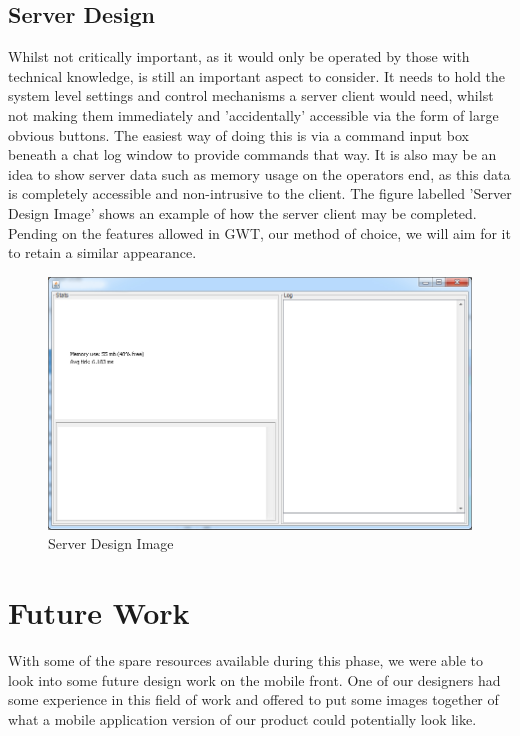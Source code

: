 \subsection{Server Design}
Whilst not critically important, as it would only be operated by those with 
technical knowledge, is still an important aspect to consider. It needs to hold 
the system level settings and control mechanisms a server client would need, 
whilst not making them immediately and 'accidentally' accessible via the form of 
large obvious buttons. The easiest way of doing this is via a command input box 
beneath a chat log window to provide commands that way. It is also may be an 
idea to show server data such as memory usage on the operators end, as this data 
is completely accessible and non-intrusive to the client. The figure labelled 
'Server Design Image' shows an example of how the server client may be completed.
Pending on the features allowed in GWT, our method of choice, we will aim for 
it to retain a similar appearance.

\begin{figure}[h]
    \centering
    \includegraphics[width=\textwidth]{images/design/server.jpg}
    \caption{Server Design Image}
    \label{fig:server}
\end{figure}

\section{Future Work}
With some of the spare resources available during this phase, we were able to 
look into some future design work on the mobile front. One of our designers had
some experience in this field of work and offered to put some images together 
of what a mobile application version of our product could potentially look like. 

